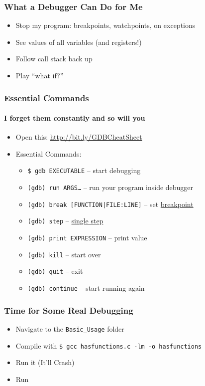 \documentclass{beamer}
\newcommand{\code}{\texttt}
\begin{document}
\begin{frame}
    \frametitle{What a Debugger Can Do for Me}

    \begin{itemize}
        \item Stop my program: breakpoints, watchpoints, on exceptions
        \item See values of all variables (and registers!)
        \item Follow call stack back up
        \item Play ``what if?''
    \end{itemize}

\end{frame}
\begin{frame}
    \frametitle{Essential Commands}
    \framesubtitle{I forget them constantly and so will you}
    \begin{itemize}
        \item Open this: \url{http://bit.ly/GDBCheatSheet}
        \item Essential Commands:
        \begin{itemize}
            \item \code{\$ gdb EXECUTABLE} -- start debugging
            \item \code{(gdb) run ARGS\dots} -- run your program inside debugger
            \item \code{(gdb) break [FUNCTION|FILE:LINE]} -- set \underline{breakpoint}
            \item \code{(gdb) step} -- \underline{single step}
            \item \code{(gdb) print EXPRESSION} -- print value
            \item \code{(gdb) kill} -- start over
            \item \code{(gdb) quit} -- exit
            \item \code{(gdb) continue} -- start running again
        \end{itemize}
    \end{itemize}
    

\end{frame}

\begin{frame}
    \frametitle{Time for Some Real Debugging}

    \begin{itemize}
        \item Navigate to the \code{Basic\_Usage} folder
        \item Compile with \code{\$~gcc~hasfunctions.c~-lm~-o~hasfunctions}
        \item Run it (It'll Crash)
        \item Run \code{}
    \end{itemize}

\end{frame}
\end{document}
